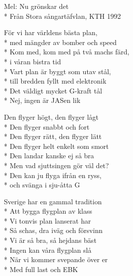 \begin{SongText}
    \begin{SongInfo}
        Mel: Nu grönskar det\\*%
        Från Stora sångartäfvlan, KTH 1992
    \end{SongInfo}
    \begin{SongVerse}
        För vi har världens bästa plan,\\*%
        med mängder av bomber och speed\\*%
        Kom med, kom med på två machs färd,\\*%
        i våran bistra tid\\*%
        Vart plan är byggt som utav stål,\\*%
        till bredden fyllt med elektronik\\*%
        Det väldigt mycket G-kraft tål\\*%
        Nej, ingen är JASen lik
    \end{SongVerse}
    \begin{SongVerse}
        Den flyger högt, den flyger lågt\\*%
        Den flyger snabbt och fort\\*%
        Den flyger rätt, den flyger lätt\\*%
        Den flyger helt enkelt som smort\\*%
        Den landar kanske ej så bra\\*%
        Men vad sjuttsingen gör väl det?\\*%
        Den kan ju flyga ifrån en ryss,\\*%
        och svänga i sju-åtta G
    \end{SongVerse}
    \begin{SongVerse}
        Sverige har en gammal tradition\\*%
        Att bygga flygplan av klass\\*%
        Vi tonvis plan lanserat har\\*%
        Så schas, dra iväg och försvinn\\*%
        Vi är så bra, så hejdans bäst\\*%
        Ingen kan våra flygplan slå\\*%
        När vi kommer svepande över er\\*%
        Med full last och EBK
    \end{SongVerse}
\end{SongText}

